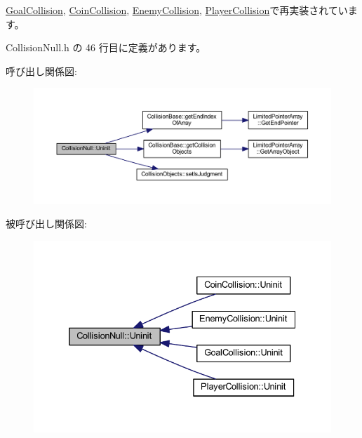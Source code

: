 \mbox{\hyperlink{class_goal_collision_ab818bad44ffcd595f1c495e659c0b348}{Goal\+Collision}}, \mbox{\hyperlink{class_coin_collision_aa852afdcdbedcf82809df9c7fd99be9e}{Coin\+Collision}}, \mbox{\hyperlink{class_enemy_collision_a2a194c606fd162db803c70c6fed9b9e4}{Enemy\+Collision}}, \mbox{\hyperlink{class_player_collision_aa1ab60a62fa2ae3231a1ea0bc8faf801}{Player\+Collision}}で再実装されています。



 Collision\+Null.\+h の 46 行目に定義があります。

呼び出し関係図\+:\nopagebreak
\begin{figure}[H]
\begin{center}
\leavevmode
\includegraphics[width=350pt]{class_collision_null_a7c6d0ec502efc55e2f406415451152f5_cgraph}
\end{center}
\end{figure}
被呼び出し関係図\+:\nopagebreak
\begin{figure}[H]
\begin{center}
\leavevmode
\includegraphics[width=332pt]{class_collision_null_a7c6d0ec502efc55e2f406415451152f5_icgraph}
\end{center}
\end{figure}
\mbox{\label{class_collision_null_a5e5e094e3fbe3ccc0515e485c739bd15}} 
